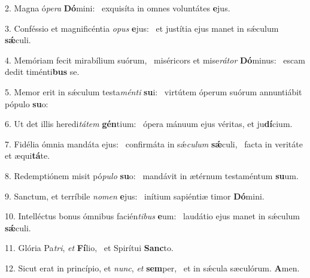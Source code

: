 2. Magna ó\textit{pe}\textit{ra} \textbf{Dó}mini: \ast\  exquisíta in omnes voluntátes \textbf{e}jus.\

3. Conféssio et magnificéntia \textit{o}\textit{pus} \textbf{e}jus: \ast\  et justítia ejus manet in sǽculum \textbf{sǽ}culi.\

4. Memóriam fecit mirabílium suórum, \dag\  miséricors et mise\textit{rá}\textit{tor} \textbf{Dó}minus: \ast\  escam dedit timénti\textbf{bus} se.\

5. Memor erit in sǽculum testa\textit{mén}\textit{ti} \textbf{su}i: \ast\  virtútem óperum suórum annuntiábit pópulo \textbf{su}o:\

6. Ut det illis heredi\textit{tá}\textit{tem} \textbf{gén}tium: \ast\  ópera mánuum ejus véritas, et ju\textbf{dí}cium.\

7. Fidélia ómnia mandáta ejus: \dag\  confirmáta in sǽ\textit{cu}\textit{lum} \textbf{sǽ}culi, \ast\  facta in veritáte et æqui\textbf{tá}te.\

8. Redemptiónem misit pó\textit{pu}\textit{lo} \textbf{su}o: \ast\  mandávit in ætérnum testaméntum \textbf{su}um.\

9. Sanctum, et terríbile \textit{no}\textit{men} \textbf{e}jus: \ast\  inítium sapiéntiæ timor \textbf{Dó}mini.\

10. Intelléctus bonus ómnibus facién\textit{ti}\textit{bus} \textbf{e}um: \ast\  laudátio ejus manet in sǽculum \textbf{sǽ}culi.\

11. Glória Pa\textit{tri}, \textit{et} \textbf{Fí}lio, \ast\  et Spirítui \textbf{Sanc}to.\

12. Sicut erat in princípio, et \textit{nunc}, \textit{et} \textbf{sem}per, \ast\  et in sǽcula sæculórum. \textbf{A}men.\

